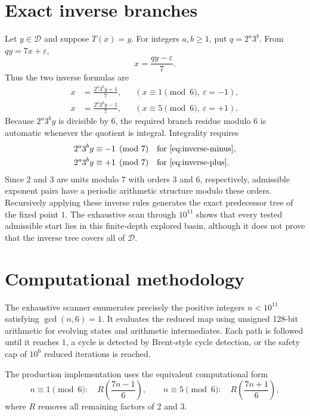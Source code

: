 \documentclass[11pt]{article}
\begin{document}
\section{Exact inverse branches}
Let $y\in\mathcal D$ and suppose $T(x)=y$. For integers $a,b\ge1$, put $q=2^a3^b$. From $qy=7x+\varepsilon$,
\begin{equation}
x=\frac{qy-\varepsilon}{7}.
\label{eq:inverse-general}
\end{equation}
Thus the two inverse formulas are
\begin{align}
x&=\frac{2^a3^b y+1}{7}, &&(x\equiv1\pmod6,\ \varepsilon=-1),\label{eq:inverse-minus}\\
x&=\frac{2^a3^b y-1}{7}, &&(x\equiv5\pmod6,\ \varepsilon=+1).\label{eq:inverse-plus}
\end{align}
Because $2^a3^b y$ is divisible by $6$, the required branch residue modulo $6$ is automatic whenever the quotient is integral. Integrality requires
\begin{align}
2^a3^b y&\equiv-1\pmod7 &&\text{for \eqref{eq:inverse-minus}},\\
2^a3^b y&\equiv+1\pmod7 &&\text{for \eqref{eq:inverse-plus}}.
\end{align}
Since $2$ and $3$ are units modulo $7$ with orders $3$ and $6$, respectively, admissible exponent pairs have a periodic arithmetic structure modulo these orders. Recursively applying these inverse rules generates the exact predecessor tree of the fixed point $1$. The exhaustive scan through $10^{11}$ shows that every tested admissible start lies in this finite-depth explored basin, although it does not prove that the inverse tree covers all of $\mathcal D$.

\section{Computational methodology}
The exhaustive scanner enumerates precisely the positive integers $n<10^{11}$ satisfying $\gcd(n,6)=1$. It evaluates the reduced map using unsigned 128-bit arithmetic for evolving states and arithmetic intermediates. Each path is followed until it reaches $1$, a cycle is detected by Brent-style cycle detection, or the safety cap of $10^6$ reduced iterations is reached.

The production implementation uses the equivalent computational form
\[
n\equiv1\pmod6:\quad R\!\left(\frac{7n-1}{6}\right),
\qquad
n\equiv5\pmod6:\quad R\!\left(\frac{7n+1}{6}\right),
\]
where $R$ removes all remaining factors of $2$ and $3$.
\end{document}
